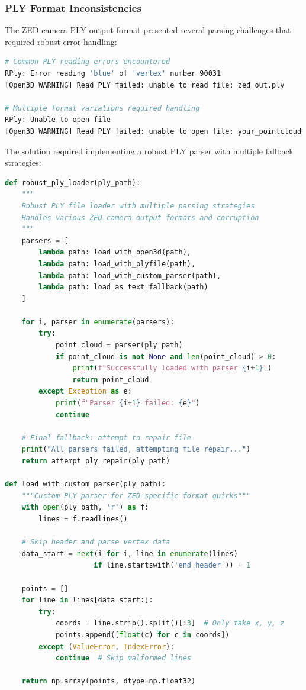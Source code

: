\documentclass[12pt,a4paper]{report}
\begin{document}
\subsubsection{PLY Format Inconsistencies}

The ZED camera PLY output format presented several parsing challenges that required robust error handling:

\begin{lstlisting}[caption=ZED PLY Format Error Handling, label=lst:zed_ply_errors, language=bash]
# Common PLY reading errors encountered
RPly: Error reading 'blue' of 'vertex' number 90031
[Open3D WARNING] Read PLY failed: unable to read file: zed_out.ply

# Multiple format variations required handling
RPly: Unable to open file
[Open3D WARNING] Read PLY failed: unable to open file: your_pointcloud.ply
\end{lstlisting}

The solution required implementing a robust PLY parser with multiple fallback strategies:

\begin{lstlisting}[caption=Robust ZED PLY Parser Implementation, label=lst:robust_ply_parser, language=python]
def robust_ply_loader(ply_path):
    """
    Robust PLY file loader with multiple parsing strategies
    Handles various ZED camera output formats and corruption
    """
    parsers = [
        lambda path: load_with_open3d(path),
        lambda path: load_with_plyfile(path),
        lambda path: load_with_custom_parser(path),
        lambda path: load_as_text_fallback(path)
    ]
    
    for i, parser in enumerate(parsers):
        try:
            point_cloud = parser(ply_path)
            if point_cloud is not None and len(point_cloud) > 0:
                print(f"Successfully loaded with parser {i+1}")
                return point_cloud
        except Exception as e:
            print(f"Parser {i+1} failed: {e}")
            continue
    
    # Final fallback: attempt to repair file
    print("All parsers failed, attempting file repair...")
    return attempt_ply_repair(ply_path)

def load_with_custom_parser(ply_path):
    """Custom PLY parser for ZED-specific format quirks"""
    with open(ply_path, 'r') as f:
        lines = f.readlines()
    
    # Skip header and parse vertex data
    data_start = next(i for i, line in enumerate(lines) 
                     if line.startswith('end_header')) + 1
    
    points = []
    for line in lines[data_start:]:
        try:
            coords = line.strip().split()[:3]  # Only take x, y, z
            points.append([float(c) for c in coords])
        except (ValueError, IndexError):
            continue  # Skip malformed lines
    
    return np.array(points, dtype=np.float32)
\end{lstlisting}
\end{document}
